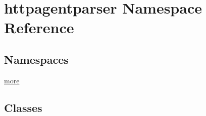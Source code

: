 \hypertarget{namespacehttpagentparser}{}\section{httpagentparser Namespace Reference}
\label{namespacehttpagentparser}
\subsection*{Namespaces}
\begin{DoxyCompactItemize}
\item 
 \hyperlink{namespacehttpagentparser_1_1more}{more}
\end{DoxyCompactItemize}
\subsection*{Classes}
